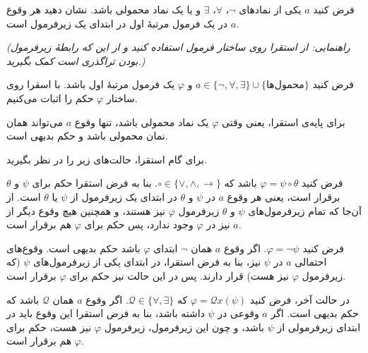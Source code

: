 فرض کنید $a$ یکی از نمادهای $\neg$، $\forall$، $\exists$ و یا یک نماد محمولی باشد. نشان دهید هر وقوع $a$ در یک فرمول مرتبهٔ اول در ابتدای یک زیرفرمول است.

\emph{(راهنمایی: از استقرا روی ساختار فرمول استفاده کنید و از این که رابطهٔ زیرفرمول بودن تراگذری است کمک بگیرید.)}
\begin{ans}
  فرض کنید $a \in \{\neg, \forall, \exists\} \cup \{\text{محمول‌ها}\}$ و $\varphi$ یک فرمول مرتبهٔ اول باشد. با اسقرا روی ساختار $\varphi$ حکم را اثبات می‌کنیم.

  برای پایه‌ی استقرا، یعنی وقتی $\varphi$ یک نماد محمولی باشد، تنها وقوع $a$ می‌تواند همان نمان محمولی باشد و حکم بدیهی است.

  برای گام استقرا، حالت‌های زیر را در نظر بگیرید.
  
  فرض کنید $\varphi = \psi \circ \theta$ باشد که $\circ \in \{\vee, \wedge, \rightarrow\}$. بنا به فرض استقرا حکم برای $\psi$ و $\theta$ برقرار است، یعنی هر وقوع $a$ در $\psi$ و $\theta$ در ابتدای یک زیرفرمول از $\psi$ یا $\theta$ است. از آن‌جا که تمام زیرفرمول‌های $\psi$ و $\theta$ زیرفرمول $\varphi$ نیز هستند، و همچنین هیچ وقوع دیگر از $a$ نیز در $\varphi$ وجود ندارد، پس حکم برای $\varphi$ هم برقرار است.

  فرض کنید $\varphi = \neg \psi$. اگر وقوع $a$ همان $\neg$ ابتدای $\varphi$ باشد حکم بدیهی است. وقوع‌های احتمالی $a$ در $\psi$ نیز، بنا به فرض استقرا، در ابتدای یکی از زیرفرمول‌های $\psi$ (که زیرفرمول $\varphi$ نیز هست) قرار دارند. پس در این حالت نیز حکم برای $\varphi$ برقرار است.

  در حالت آخر، فرض کنید $\varphi = \mathcal{Q} x (\psi)$ که $\mathcal{Q} \in \{\forall, \exists\}$.
  اگر وقوع $a$ همان $\mathcal{Q}$ باشد که حکم بدیهی است. اگر $a$ وقوعی در $\psi$ داشته باشد، بنا به فرض استقرا این وقوع باید در ابتدای زیرفرمولی از $\psi$ باشد، و چون این زیرفرمول، زیرفرمول $\varphi$ نیز هست، حکم برای $\varphi$ هم برقرار است.
\end{ans}
